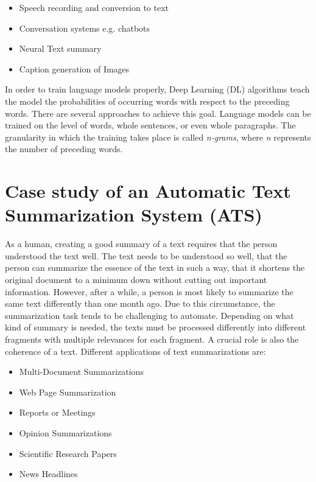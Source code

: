 \begin{itemize}
\item Speech recording and conversion to text
\item Conversation systems e.g. chatbots
\item Neural Text summary
\item Caption generation of Images
\end{itemize} 

In order to train language models properly, Deep Learning (DL) algorithms teach the model the probabilities of occurring words with respect to the preceding words. There are several approaches to achieve this goal. Language models can be trained on the level of words, whole sentences, or even whole paragraphs. The granularity in which the training takes place is called \textit{n-grams}, where \textit{n} represents the number of preceding words. 


\section{Case study of an Automatic Text Summarization System (ATS)}\label{ss:case}

As a human, creating a good summary of a text requires that the person understood the text well. The text needs to be understood so well, that the person can summarize the essence of the text in such a way, that it shortens the original document to a minimum down without cutting out important information. However, after a while, a person is most likely to summarize the same text differently than one month ago. Due to this circumstance, the summarization task tends to be challenging to automate. Depending on what kind of summary is needed, the texts must be processed differently into different fragments with multiple relevances for each fragment. A crucial role is also the coherence of a text. Different applications of text summarizations are:

\begin{itemize}
	\item Multi-Document Summarizations
	\item Web Page Summarization
	\item Reports or Meetings
	\item Opinion Summarizations
	\item Scientific Research Papers
	\item News Headlines
\end{itemize}

